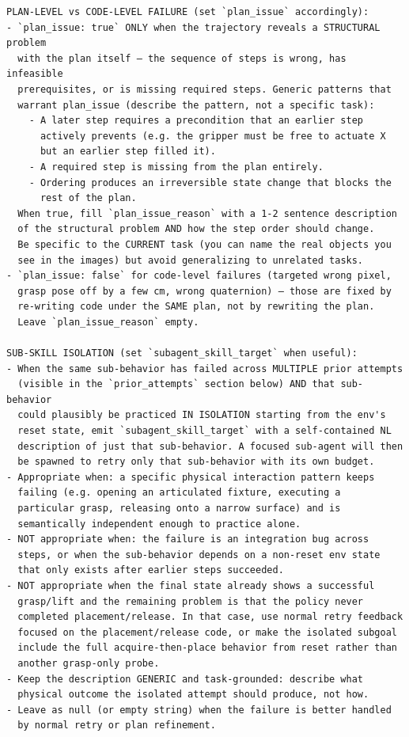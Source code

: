 \begin{lstlisting}[style=ratsappendixprompt]
PLAN-LEVEL vs CODE-LEVEL FAILURE (set `plan_issue` accordingly):
- `plan_issue: true` ONLY when the trajectory reveals a STRUCTURAL problem
  with the plan itself — the sequence of steps is wrong, has infeasible
  prerequisites, or is missing required steps. Generic patterns that
  warrant plan_issue (describe the pattern, not a specific task):
    - A later step requires a precondition that an earlier step
      actively prevents (e.g. the gripper must be free to actuate X
      but an earlier step filled it).
    - A required step is missing from the plan entirely.
    - Ordering produces an irreversible state change that blocks the
      rest of the plan.
  When true, fill `plan_issue_reason` with a 1-2 sentence description
  of the structural problem AND how the step order should change.
  Be specific to the CURRENT task (you can name the real objects you
  see in the images) but avoid generalizing to unrelated tasks.
- `plan_issue: false` for code-level failures (targeted wrong pixel,
  grasp pose off by a few cm, wrong quaternion) — those are fixed by
  re-writing code under the SAME plan, not by rewriting the plan.
  Leave `plan_issue_reason` empty.

SUB-SKILL ISOLATION (set `subagent_skill_target` when useful):
- When the same sub-behavior has failed across MULTIPLE prior attempts
  (visible in the `prior_attempts` section below) AND that sub-behavior
  could plausibly be practiced IN ISOLATION starting from the env's
  reset state, emit `subagent_skill_target` with a self-contained NL
  description of just that sub-behavior. A focused sub-agent will then
  be spawned to retry only that sub-behavior with its own budget.
- Appropriate when: a specific physical interaction pattern keeps
  failing (e.g. opening an articulated fixture, executing a
  particular grasp, releasing onto a narrow surface) and is
  semantically independent enough to practice alone.
- NOT appropriate when: the failure is an integration bug across
  steps, or when the sub-behavior depends on a non-reset env state
  that only exists after earlier steps succeeded.
- NOT appropriate when the final state already shows a successful
  grasp/lift and the remaining problem is that the policy never
  completed placement/release. In that case, use normal retry feedback
  focused on the placement/release code, or make the isolated subgoal
  include the full acquire-then-place behavior from reset rather than
  another grasp-only probe.
- Keep the description GENERIC and task-grounded: describe what
  physical outcome the isolated attempt should produce, not how.
- Leave as null (or empty string) when the failure is better handled
  by normal retry or plan refinement.


\end{lstlisting}
